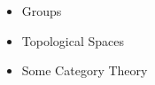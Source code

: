 \documentclass[preview]{standalone}
\begin{document}
\begin{center}
\begin{itemize} \item Groups \item Topological Spaces \item Some Category Theory\end{itemize}
\end{center}
\end{document}
